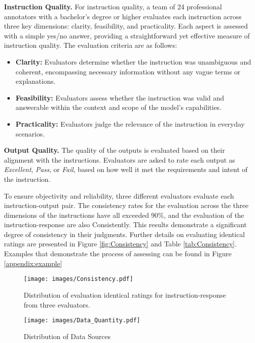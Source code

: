 \noindent
\textbf{Instruction Quality.} For instruction quality, a team of 24 professional annotators with a bachelor's degree or higher evaluates each instruction across three key dimensions: clarity, feasibility, and practicality. Each aspect is assessed with a simple yes/no answer, providing a straightforward yet effective measure of instruction quality. The evaluation criteria are as follows:
\begin{itemize}
    \item \textbf{Clarity:} Evaluators determine whether the instruction was unambiguous and coherent, encompassing necessary information without any vague terms or explanations.

    \item \textbf{Feasibility:} Evaluators assess whether the instruction was valid and answerable within the context and scope of the model's capabilities.

    \item \textbf{Practicality:} Evaluators judge the relevance of the instruction in everyday scenarios.
\end{itemize}

\noindent
\textbf{Output Quality.} The quality of the outputs is evaluated based on their alignment with the instructions. Evaluators are asked to rate each output as \emph{Excellent}, \emph{Pass}, or \emph{Fail}, based on how well it met the requirements and intent of the instruction.

To ensure objectivity and reliability, three different evaluators evaluate each instruction-output pair.  The consistency rates for the evaluation across the three dimensions of the instructions have all exceeded 90\%, and the evaluation of the instruction-response are also Consistently. This results demonstrate a significant degree of consistency in their judgments. Further details on evaluating identical ratings are presented in Figure \ref{fig:Consistency} and Table \ref{tab:Consistency}. Examples that demonstrate the process of assessing can be found in Figure \ref{appendix:example}
﻿

\begin{figure}[ht]
    \centering
    \begin{minipage}{0.45\textwidth}
        \centering
        \vspace{0.2cm}
        \texttt{[image: images/Consistency.pdf]}
        \caption{Distribution of evaluation identical ratings for instruction-response from three evaluators.}
        \label{fig:Consistency}
    \end{minipage}
    \hfill
    \begin{minipage}{0.45\textwidth}
        \centering
        \vspace{-0.1cm}
        \texttt{[image: images/Data\_Quantity.pdf]}
        \vspace{0.03cm}
        \caption{Distribution of Data Sources}
        \label{fig:quantity}
    \end{minipage}
\end{figure}

